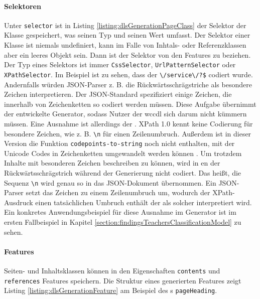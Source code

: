     \paragraph{Selektoren}
    Unter \texttt{selector} ist in Listing \ref{listing:dlsGenerationPageClass}
    der Selektor der Klasse gespeichert,
    was seinen Typ und seinen Wert umfasst.
    Der Selektor einer Klasse ist niemals undefiniert,
    kann im Falle von Inhtals- oder Referenzklassen aber ein leeres Objekt sein.
    Dann ist der Selektor von den Features zu beziehen.
    Der Typ eines Selektors ist immer \texttt{CssSelector},
    \texttt{UrlPatternSelector} oder \texttt{XPathSelector}.
    Im Beispiel ist zu sehen, dass der {\urlSelector} \verb+\/service\/?$+ codiert wurde.
    Andernfalls würden JSON-Parser z. B. die Rückwärtsschrägstriche als besondere Zeichen interpretieren.
    Der JSON-Standard \cite[Kapitel 7]{rfc:8259} spezifiziert einige Zeichen,
    die innerhalb von Zeichenketten so codiert werden müssen.
    Diese Aufgabe übernimmt der entwickelte Generator,
    sodass Nutzer der \gls{wccdl} sich darum nicht kümmern müssen.
    Eine Ausnahme ist allerdings der {\xpathSelector}.
    XPath 1.0 kennt keine Codierung für besondere Zeichen,
    wie z. B. \texttt{\textbackslash{n}} für einen Zeilenumbruch.
    Außerdem ist in dieser Version die Funktion
    \texttt{codepoints-to-string} noch nicht enthalten,
    mit der Unicode Codes in Zeichenketten umgewandelt werden können
    \cite{w3c:xpath}
    \cite[Kapitel 5.2.1]{w3c:xpathXquery}.
    Um trotzdem Inhalte mit besonderen Zeichen beschreiben zu können,
    wird in {\xpathSelector}en der Rückwärtsschrägstrich während der
    Generierung nicht codiert.
    Das heißt, die Sequenz \texttt{\textbackslash{n}} wird genau so in das JSON-Dokument übernommen.
    Ein JSON-Parser setzt das Zeichen zu einem Zeilenumbruch um,
    wodurch der XPath-Ausdruck einen tatsächlichen Umbruch enthält
    der als solcher interpretiert wird.
    Ein konkretes Anwendungsbeispiel für diese Ausnahme im Generator
    ist im ersten Fallbeispiel in Kapitel \ref{section:findingsTeachersClassificationModel} zu sehen.

    \paragraph{Features}
    Seiten- und Inhaltsklassen können in den Eigenschaften
    \texttt{contents} und \texttt{references} Features speichern.
    Die Struktur eines generierten Features zeigt Listing
    \ref{listing:dlsGenerationFeature} am Beispiel des {\contentFeature}s \texttt{pageHeading}.

